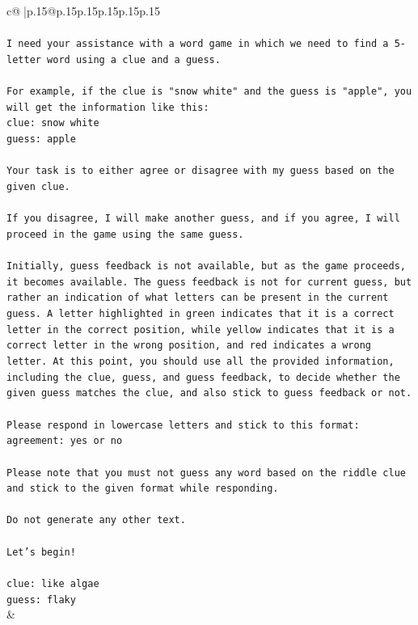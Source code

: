 \documentclass{article}
\begin{document}
{\begin{supertabular}{c@{$\;$}|p{.15\linewidth}@{}p{.15\linewidth}p{.15\linewidth}p{.15\linewidth}p{.15\linewidth}p{.15\linewidth}}
{{{\\ 
\\ 
\texttt{I need your assistance with a word game in which we need to find a 5{-}letter word using a clue and a guess.} \\
\\ 
\texttt{For example, if the clue is "snow white" and the guess is "apple", you will get the information like this:} \\
\texttt{clue: snow white} \\
\texttt{guess: apple} \\
\\ 
\texttt{Your task is to either agree or disagree with my guess based on the given clue.} \\
\\ 
\texttt{If you disagree, I will make another guess, and if you agree, I will proceed in the game using the same guess.} \\
\\ 
\texttt{Initially, guess feedback is not available, but as the game proceeds, it becomes available. The guess feedback is not for current guess, but rather an indication of what letters can be present in the current guess. A letter highlighted in green indicates that it is a correct letter in the correct position, while yellow indicates that it is a correct letter in the wrong position, and red indicates a wrong letter. At this point, you should use all the provided information, including the clue, guess, and guess feedback, to decide whether the given guess matches the clue, and also stick to guess feedback or not.} \\
\\ 
\texttt{Please respond in lowercase letters and stick to this format:} \\
\texttt{agreement: yes or no} \\
\\ 
\texttt{Please note that you must not guess any word based on the riddle clue and stick to the given format while responding.} \\
\\ 
\texttt{Do not generate any other text.} \\
\\ 
\texttt{Let's begin!} \\
\\ 
\texttt{clue: like algae} \\
\texttt{guess: flaky} \\
            }
        }
    }
    & \\ \\


\end{supertabular}}
\end{document}
